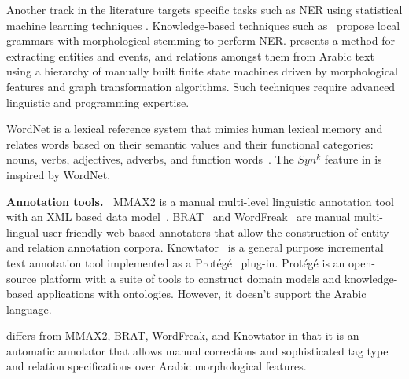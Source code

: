 Another track in the literature targets specific tasks such as NER using statistical machine learning techniques \cite{ekbal2010named,abdelrahman2010integrated}.
Knowledge-based techniques such 
as~\cite{zaghouani2010adapting,traboulsi2009arabic} propose local grammars 
with morphological stemming to perform NER. 
\cite{ZaMaHaCicling2012Entity} presents a method for extracting entities and events, and relations amongst them from Arabic text using a hierarchy of manually built 
finite state machines driven by morphological features 
and graph transformation algorithms. 
Such techniques require advanced linguistic and programming expertise. 

WordNet is a lexical reference system that mimics human lexical memory 
and relates words based on their semantic values and their functional 
categories: nouns, verbs, adjectives, adverbs, and function words~\cite{intro}.
The $Syn^k$ feature in \framework is inspired by WordNet.

{\bf Annotation tools.~}
MMAX2 is a manual multi-level linguistic annotation tool with an XML 
based data model~\cite{mmax2}.
BRAT~\cite{brat} and WordFreak~\cite{wordfreak} are manual 
multi-lingual user friendly web-based annotators that allow the construction 
of entity and relation annotation corpora.
Knowtator~\cite{ogren2006knowtator} is a general purpose incremental text annotation tool 
implemented as a Prot\'eg\'e~\cite{gennari2003evolution} plug-in. 
Prot\'eg\'e is an open-source platform with a suite of tools to construct domain models and knowledge-based applications with ontologies. 
However, it doesn't support the Arabic language.

\framework differs from MMAX2, BRAT, WordFreak, and Knowtator in that it is 
an automatic annotator that allows manual corrections 
and sophisticated tag type and relation specifications over
Arabic morphological features.

